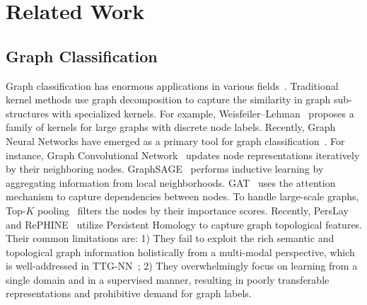\section{Related Work}
\label{sec:rework}

\subsection{Graph Classification}
Graph classification has enormous applications in various fields~\cite{zhou2020graph}. Traditional kernel methods use graph decomposition to capture the similarity in graph sub-structures with specialized kernels. For example, Weisfeiler–Lehman~\cite{shervashidze2011weisfeiler} proposes a family of kernels for large graphs with discrete node labels. Recently, Graph Neural Networks have emerged as a primary tool for graph classification~\cite{xia2021graph}. For instance, Graph Convolutional Network~\cite{kipf2016semi} updates node representations iteratively by their neighboring nodes. GraphSAGE~\cite{hamilton2017inductive} performs inductive learning by aggregating information from local neighborhoods. GAT~\cite{Velickovic2018iclr} uses the attention mechanism to capture dependencies between nodes. To handle large-scale graphs, Top-$K$ pooling~\cite{cangea2018towards, gao2019graph, horn2021topological} filters the nodes by their importance scores. Recently, PersLay~\cite{carriere2020perslay} and RePHINE~\cite{37187175462249e7b5f1073cd94984f2} utilize Persistent Homology to capture graph topological features. Their common limitations are: 1) They fail to exploit the rich semantic and topological graph information holistically from a multi-modal perspective, which is well-addressed in TTG-NN~\cite{pmlr-v238-wen24a}; 2) They overwhelmingly focus on learning from a single domain and in a supervised manner, resulting in poorly transferable representations and prohibitive demand for graph labels. 

